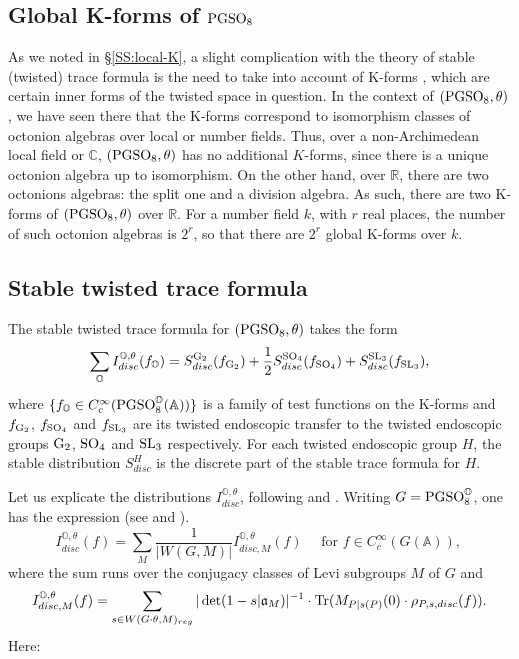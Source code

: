 \documentclass[11pt]{amsart}
\theoremstyle{plain}
\numberwithin{equation}{section}
\newcommand{\R}{\mathbb R}
\newcommand{\C}{\mathbb C}
\newcommand{\A}{\mathbb A}
\def\SL{{\rm SL}}
\def\PGSO{{\rm PGSO}}
\def\SO{{\rm SO}}
\def\A{{\mathbb A}}
\def\R{{\mathbb R}}
\def\C{{\bf C}}
\def\C{{\mathbb C}}
\begin{document}
\vskip 5pt

 \subsection{\bf Global K-forms of $\PGSO_8$} \label{SS:global-K}
As we noted in \S \ref{SS:local-K},   a slight complication with the theory of stable (twisted) trace formula is the need to take into account of K-forms \cite[\S I.1.11]{MW1}, which are certain inner forms of the twisted space in question. 
    In the context of $(\PGSO_8,\theta)$, we have seen there that the K-forms correspond to isomorphism classes of octonion algebras over local or number fields.
 Thus, over  a non-Archimedean local field  or $\C$, $(\PGSO_8, \theta)$ has no additional $K$-forms,  since there is a unique octonion algebra up to isomorphism. On the other hand,  over $\R$, there are two octonions algebras: the split one and a division algebra. As such, there are two K-forms of $(\PGSO_8, \theta)$ over $\R$. For a number field $k$,
with $r$ real places,  the number of such octonion algebras is $2^r$, so that there are $2^r$ global K-forms over $k$.   

\vskip 5pt

\subsection{\bf Stable twisted trace formula} \label{SS:STTF}
The stable twisted trace formula for $(\PGSO_8, \theta)$ takes the form  \cite[Thm. X.8.1, Pg 1241]{MW2}
\begin{equation} \label{E:stf}
\sum_{\mathbb{O}}  I^{\mathbb{O}, \theta}_{disc}(f_{\mathbb{O}})  =  S^{{\rm G}_2}_{disc}( f_{{\rm G}_2}) + \frac{1}{2} S_{disc}^{\SO_4}(f_{\SO_4})  +  S_{disc}^{\SL_3}(f_{\SL_3}), \end{equation}
where $\{ f_{\mathbb{O}} \in C^{\infty}_c(\PGSO^{\mathbb{O}}_8(\A))\}$ is a family of  test functions on the K-forms  and $f_{{\rm G}_2}$, $f_{\SO_4}$ and $f_{\SL_3}$ are its twisted endoscopic transfer to the twisted endoscopic groups ${\rm G}_2$, $\SO_4$ and $\SL_3$ respectively.   For each twisted endoscopic group $H$, the stable distribution $S^H_{disc}$ is  the discrete part of the stable trace formula for $H$. 

\vskip 5pt

Let us explicate  the distributions  $ I^{\mathbb{O}, \theta}_{disc}$, following \cite[\S 14.3]{LW} and \cite[\S X.5.1]{MW2}.
Writing $G = \PGSO^{\mathbb{O}}_8$, one has the expression  (see \cite[Thm. 14.3.1 and Prop. 14.3.2]{LW} and \cite[Pg. 125-128]{A}).
\[ 
  I^{\mathbb{O}, \theta}_{disc} (f) = \sum_M   
\frac{1}{|W(G,M)|}  I^{\mathbb{O}, \theta}_{disc,M} (f) \quad \text{ for  $f \in C^{\infty}_c(G(\A))$, } \]
where the sum runs over the conjugacy classes of Levi subgroups $M$ of $G$ and \cite[\S X.5.1]{MW2}
\[    I^{\mathbb{O}, \theta}_{disc,M}(f)  = 
 \sum_{s  \in W(G \cdot \theta, M)_{reg} }  |\det (1- s | \mathfrak{a}_M)|^{-1} \cdot  {\rm Tr} ( M_{P|s(P)}(0)\cdot  \rho_{P, s, disc}(f ) ). \] 
 Here:
 \vskip 5pt
 
\end{document}
